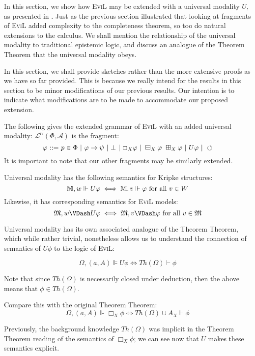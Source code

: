 In this section, we show how \textsc{EviL} may be extended with a
universal modality $U$, as presented in \cite[chapter 7, pg
79]{van_benthem_modal_2010}.  Just as the previous section illustrated that
looking at fragments of \textsc{EviL} added complexity to the
completeness theorem, so too do natural extensions to the calculus.
We shall mention the relationship of the universal modality to
traditional epistemic logic, and discuss an analogue of the Theorem
Theorem that the universal modality obeys.

In this section, we shall provide sketches rather than the more extensive
proofs as we have so far provided.  This is because we really intend
for the results in this section to be minor modifications of our
previous results.  Our intention is to indicate what modifications are
to be made to accommodate our proposed extension.

The following gives the extended grammar of \textsc{EviL} with an added
universal modality:
$\mathcal{L}^U (\Phi,\mathcal{A})$ is the fragment:
\[ \phi \ {::=} \  p \in \Phi \  | \  \phi
   \rightarrow \psi \  | \  \bot \  |
   \  \Box_X \phi \  | \  \boxminus_X \phi
   \  \BP_X \phi \  | \  U \phi
 \  | \ 
   \circlearrowleft \]
It is important to note that our other fragments may be similarly extended.

Universal modality has the following semantics for Kripke structures: 
\[ \mathbb{M}, w \Vdash U \phi \iff \mathbb{M}, v \Vdash \phi\textup{
  for all $v \in W$} \]
Likewise, it has corresponding semantics for \textsc{EviL}
models:
\[ \Omega, w \VDash U \phi \iff \Omega, v \VDash \phi\textup{
  for all $v \in \Omega$} \]

Universal modality has its own associated analogue of the Theorem Theorem, which while
rather trivial, nonetheless allows us to understand the connection of
semantics of $U \phi$ to the logic of \textsc{EviL}:
\begin{proposition}
\[\Omega,(a,A) \VDash U \phi \iff Th(\Omega) \vdash \phi\]
\end{proposition}
Note that since $Th(\Omega)$ is necessarily closed under deduction,
then the above means that $\phi \in Th(\Omega)$.

Compare this with the original Theorem Theorem:
\[ \Omega,(a,A) \VDash \Box_X \phi \iff 
Th(\Omega) \cup A_X \vdash \phi \]

Previously, the
background knowledge $Th(\Omega)$ was implicit in the 
Theorem Theorem
reading of the semantics of $\Box_X \phi$; we can see now that $U$
makes these semantics explicit.


